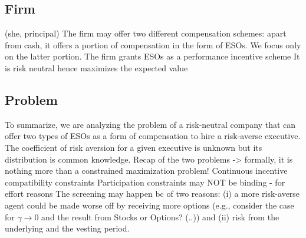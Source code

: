 \subsection{Firm}
(she, principal)
The firm may offer two different compensation schemes: apart from cash, it offers a portion of compensation in the form of ESOs. We focus only on the latter portion. The firm grants ESOs as a performance incentive scheme
It is risk neutral hence maximizes the expected value




\subsection{Problem}
To summarize, we are analyzing the problem of a risk-neutral company that can offer two types of ESOs as a form of compensation to hire a risk-averse executive. The coefficient of risk aversion for a given executive is unknown but its distribution is common knowledge.
Recap of the two problems
-> formally, it is nothing more than a constrained maximization problem!
Continuous incentive compatibility constraints
Participation constraints may NOT be binding - for effort reasons
The screening may happen bc of two reasons: (i) a more risk-averse agent could be made worse off by receiving more options (e.g., consider the case for $\gamma \rightarrow 0$ and the result from Stocks or Options? (..)) and (ii) risk from the underlying and the vesting period.

